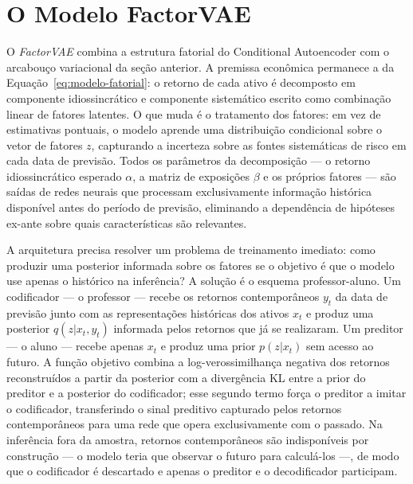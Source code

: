\section{O Modelo FactorVAE}
\label{sec:factorvae}

O \textit{FactorVAE} \parencite{duan2022} combina a estrutura fatorial do Conditional Autoencoder
\parencite{gu2021} com o arcabouço variacional da seção anterior. A premissa econômica permanece a
da Equação~\ref{eq:modelo-fatorial}: o retorno de cada ativo é decomposto em componente
idiossincrático e componente sistemático escrito como combinação linear de fatores latentes. O que
muda é o tratamento dos fatores: em vez de estimativas pontuais, o modelo aprende uma distribuição
condicional sobre o vetor de fatores $z$, capturando a incerteza sobre as fontes sistemáticas de
risco em cada data de previsão. Todos os parâmetros da decomposição --- o retorno idiossincrático
esperado $\alpha$, a matriz de exposições $\beta$ e os próprios fatores --- são saídas de redes
neurais que processam exclusivamente informação histórica disponível antes do período de previsão,
eliminando a dependência de hipóteses ex-ante sobre quais características são relevantes.

A arquitetura precisa resolver um problema de treinamento imediato: como produzir uma posterior
informada sobre os fatores se o objetivo é que o modelo use apenas o histórico na inferência? A
solução é o esquema professor-aluno. Um codificador --- o professor --- recebe os retornos
contemporâneos $y_t$ da data de previsão junto com as representações históricas dos ativos $x_t$
e produz uma posterior $q(z|x_t, y_t)$ informada pelos retornos que já se realizaram. Um preditor
--- o aluno --- recebe apenas $x_t$ e produz uma prior $p(z|x_t)$ sem acesso ao futuro. A função
objetivo combina a log-verossimilhança negativa dos retornos reconstruídos a partir da posterior
com a divergência KL entre a prior do preditor e a posterior do codificador; esse segundo termo
força o preditor a imitar o codificador, transferindo o sinal preditivo capturado pelos retornos
contemporâneos para uma rede que opera exclusivamente com o passado. Na inferência fora da amostra,
retornos contemporâneos são indisponíveis por construção --- o modelo teria que observar o futuro
para calculá-los ---, de modo que o codificador é descartado e apenas o preditor e o decodificador
participam.

